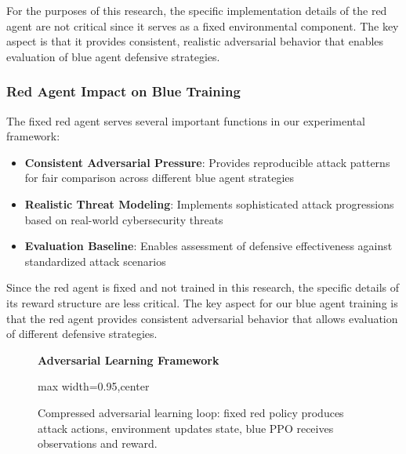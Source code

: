 \documentclass[12pt,oneside,a4paper]{article}
\theoremstyle{definition}
\theoremstyle{plain}
\begin{document}
For the purposes of this research, the specific implementation details of the red agent are not critical since it serves as a fixed environmental component. The key aspect is that it provides consistent, realistic adversarial behavior that enables evaluation of blue agent defensive strategies.

\subsubsection{Red Agent Impact on Blue Training}
The fixed red agent serves several important functions in our experimental framework:
\begin{itemize}
\item \textbf{Consistent Adversarial Pressure}: Provides reproducible attack patterns for fair comparison across different blue agent strategies
\item \textbf{Realistic Threat Modeling}: Implements sophisticated attack progressions based on real-world cybersecurity threats
\item \textbf{Evaluation Baseline}: Enables assessment of defensive effectiveness against standardized attack scenarios
\end{itemize}

Since the red agent is fixed and not trained in this research, the specific details of its reward structure are less critical. The key aspect for our blue agent training is that the red agent provides consistent adversarial behavior that allows evaluation of different defensive strategies.

\begin{figure}[H]
\centering
\textbf{Adversarial Learning Framework}
\medskip
\begin{adjustbox}{max width=0.95\linewidth,center}
\end{adjustbox}
\caption{Compressed adversarial learning loop: fixed red policy produces attack actions, environment updates state, blue PPO receives observations and reward.}
\label{fig:adversarial_framework}
\end{figure}
\end{document}
